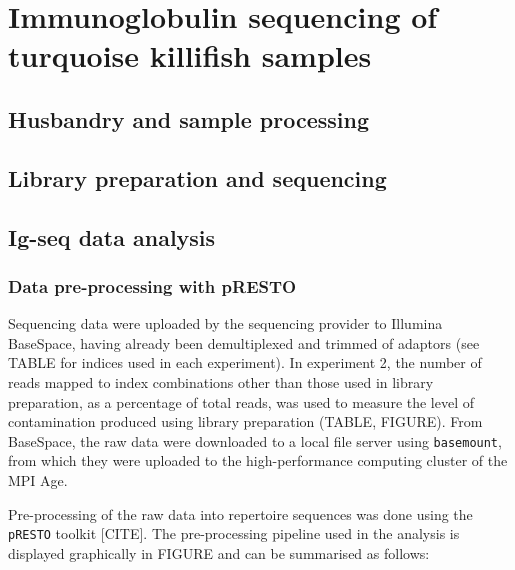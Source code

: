 \section{Immunoglobulin sequencing of turquoise killifish samples}

\subsection{Husbandry and sample processing}

\subsection{Library preparation and sequencing}

\subsection{Ig-seq data analysis}

\subsubsection{Data pre-processing with pRESTO}

Sequencing data were uploaded by the sequencing provider to Illumina BaseSpace, having already been demultiplexed and trimmed of adaptors (see TABLE for indices used in each experiment). In experiment 2, the number of reads mapped to index combinations other than those used in library preparation, as a percentage of total reads, was used to measure the level of contamination produced using library preparation (TABLE, FIGURE). From BaseSpace, the raw data were downloaded to a local file server using \texttt{basemount}, from which they were uploaded to the high-performance computing cluster of the MPI Age.

Pre-processing of the raw data into repertoire sequences was done using the \texttt{pRESTO} toolkit [CITE]. The pre-processing pipeline used in the analysis is displayed graphically in FIGURE and can be summarised as follows:

